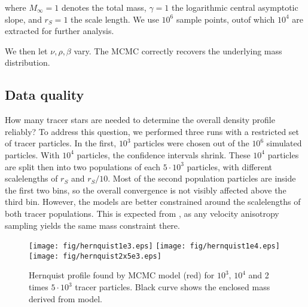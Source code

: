 where $M_\infty=1$ denotes the total mass, $\gamma=1$ the logarithmic
central asymptotic slope, and $r_S=1$ the scale length. We use $10^6$
sample points, outof which $10^4$ are extracted for further analysis.

We then let $\nu, \rho, \beta$ vary. The MCMC correctly recovers the
underlying mass distribution.



\subsection{Data quality}
How many tracer stars are needed to determine the overall density
profile reliably? To address this question, we performed three runs
with a restricted set of tracer particles. In the first, $10^3$
particles were chosen out of the $10^6$ simulated particles. With
$10^4$ particles, the confidence intervals shrink. These $10^4$
particles are split then into two populations of each $5\cdot10^3$
particles, with different scalelengths of $r_S$ and $r_S/10$. Most of
the second population particles are inside the first two bins, so the
overall convergence is not visibly affected above the third bin.
However, the models are better constrained around the scalelengths of
both tracer populations. This is expected from
\citet{WalkerPenarrubia2011}, as any velocity anisotropy sampling
yields the same mass constraint there.


\begin{figure*}
\begin{center}
\hspace{-7mm}
\texttt{[image: fig/hernquist1e3.eps]}
\texttt{[image: fig/hernquist1e4.eps]}
\texttt{[image: fig/hernquist2x5e3.eps]}
\caption{Hernquist profile found by MCMC model (red) for $10^3$,
  $10^4$ and 2 times $5\cdot10^3$ tracer particles. Black curve
  shows the enclosed mass derived from model.}
\label{fig:hernquist1e3}
\end{center}
\end{figure*}


